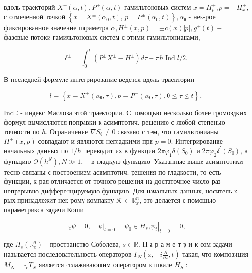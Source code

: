 \documentclass[10pt]{article}
\begin{document}
вдоль траекторий $X^{ \pm}(\alpha, t), P^{ \pm}(\alpha, t)$ гамильтоновых систем $\dot{x}=H_{p}^{ \pm}, \dot{p}=-H_{x}^{ \pm}$, с отмеченной точкой $\left\{x=X^{ \pm}\left(\alpha_{0}, t\right)\right.$, $\left.p=P^{ \pm}\left(\alpha_{0}, t\right)\right\}, \alpha_{0}$ - нек-рое фиксированное значение параметра $\alpha, H^{ \pm}(x, p)= \pm c(x)|p|, g^{ \pm}(t)-$ фазовые потоки гамильтоновых систем с этими гамильтонианами,



\[

\delta^{ \pm}=\int_{0}^{t}\left(P^{ \pm} X^{ \pm}-H^{ \pm}\right) d \tau+\pi h \operatorname{Ind} l / 2 .

\]



В последней формуле интегрирование ведется вдоль траектории



\[

l=\left\{x=X^{ \pm}\left(\alpha_{0}, \tau\right), p=P^{ \pm}\left(\alpha_{0}, \tau\right), 0 \leqslant \tau \leqslant t\right\},

\]



Ind $l$ - индекс Маслова этой траектории. С помощью несколько более громоздких формул вычисляются поправки к асимптотич. решению с любой степенью точности по $h$. Ограничение $\nabla S_{0} \neq 0$ связано с тем, что гамильтонианы $H^{ \pm}(x, p)$ совпадают и являются негладкими при $p=0$. Интегрирование начальных данных по $1 / h$ переводит их в функции $2 \pi \varphi_{1} \delta\left(S_{0}\right)$ и $2 \pi \varphi_{2} \delta^{\prime}\left(S_{0}\right)$, а функцию $O\left(h^{N}\right), N \gg 1,-$ в гладкую функцию. Указанные выше асимптотики тесно связаны с построением асимптотич. решения по гладкости, то есть функции, к-рая отличается от точного решения на достаточное число раз непрерывно дифференцируемую функцию. Для начальных данных, носитель к-рых принадлежит нек-рому компакту $\mathscr{K} \subset \mathbb{R}_{x}^{n}$, это делается с помошью параметрикса задачи Коши



\[

\square_{c} \psi=0,\left.\quad \psi\right|_{t=0}=\psi_{0} \in H_{s},\left.\psi_{t}\right|_{t=0}=0,

\]



где $H_{s}\left(\mathbb{R}_{x}^{n}\right)$ - пространство Соболева, $s \in \mathbb{R}$. П а р а м е т р и к сом задачи называется последовательность операторов $T_{N}\left(x,-i \frac{\partial}{\partial x}, t\right)$ такая, что композиция $M_{N}=\square_{c} T_{N}$ является сглаживаюшим оператором в шкале $H_{S}$ :
\end{document}
